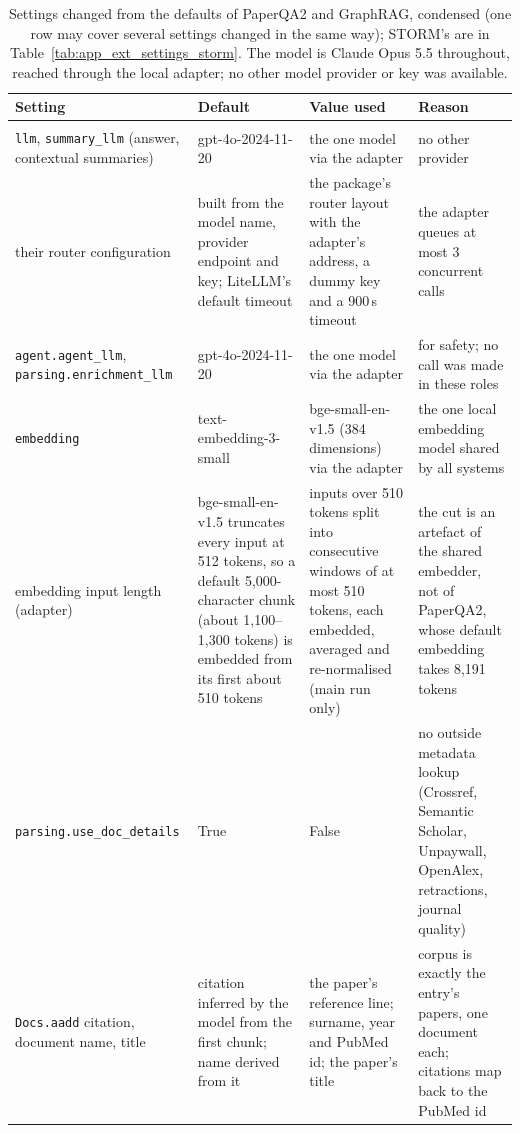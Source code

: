 \documentclass{article} %
\begin{document}
\begin{table}[!htbp]
\caption{Settings changed from the defaults of PaperQA2 and GraphRAG, condensed (one row may cover several settings changed in the same way); STORM's are in Table~\ref{tab:app_ext_settings_storm}. The model is Claude Opus 5.5 throughout, reached through the local adapter; no other model provider or key was available.}
\label{tab:app_ext_settings}
\scriptsize
\setlength{\tabcolsep}{3pt}
\begin{tabularx}{\linewidth}{>{\raggedright\arraybackslash}p{2.9cm}>{\raggedright\arraybackslash}p{2.9cm}>{\raggedright\arraybackslash}p{3.2cm}>{\raggedright\arraybackslash}X}
\toprule
Setting & Default & Value used & Reason \\
\midrule
\multicolumn{4}{l}{\emph{PaperQA2 (paper-qa 2026.8.12)}} \\
\texttt{llm}, \texttt{summary\_llm} (answer, contextual summaries) & gpt-4o-2024-11-20 & the one model via the adapter & no other provider \\
their router configuration & built from the model name, provider endpoint and key; LiteLLM's default timeout & the package's router layout with the adapter's address, a dummy key and a 900\,s timeout & the adapter queues at most 3 concurrent calls \\
\texttt{agent.}\allowbreak\texttt{agent\_llm}, \texttt{parsing.}\allowbreak\texttt{enrichment\_llm} & gpt-4o-2024-11-20 & the one model via the adapter & for safety; no call was made in these roles \\
\texttt{embedding} & text-embedding-3-small & bge-small-en-v1.5 (384 dimensions) via the adapter & the one local embedding model shared by all systems \\
embedding input length (adapter) & bge-small-en-v1.5 truncates every input at 512 tokens, so a default 5,000-character chunk (about 1,100--1,300 tokens) is embedded from its first about 510 tokens & inputs over 510 tokens split into consecutive windows of at most 510 tokens, each embedded, averaged and re-normalised (main run only) & the cut is an artefact of the shared embedder, not of PaperQA2, whose default embedding takes 8,191 tokens \\
\texttt{parsing.}\allowbreak\texttt{use\_doc\_details} & True & False & no outside metadata lookup (Crossref, Semantic Scholar, Unpaywall, OpenAlex, retractions, journal quality) \\
\texttt{Docs.aadd} citation, document name, title & citation inferred by the model from the first chunk; name derived from it & the paper's reference line; surname, year and PubMed id; the paper's title & corpus is exactly the entry's papers, one document each; citations map back to the PubMed id \\

\end{tabularx}
\end{table}
\end{document}
